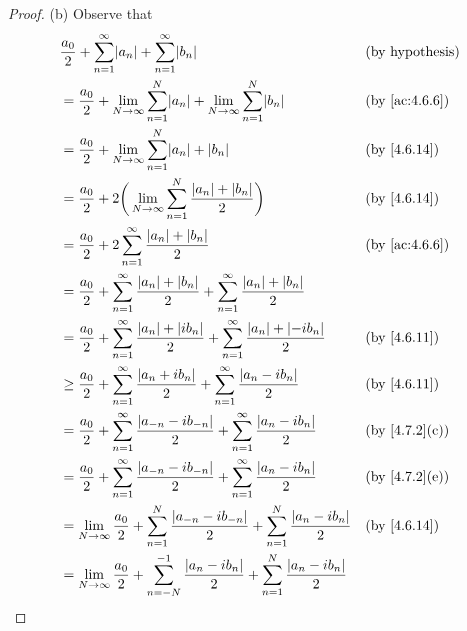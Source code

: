 \begin{proof}{(b)}
  Observe that
  \begin{align*}
     & \dfrac{a_0}{2} + \sum_{n = 1}^\infty \abs{a_n} + \sum_{n = 1}^\infty \abs{b_n}                                                               &  & \text{(by hypothesis)}      \\
     & = \dfrac{a_0}{2} + \lim_{N \to \infty} \sum_{n = 1}^N \abs{a_n} + \lim_{N \to \infty} \sum_{n = 1}^N \abs{b_n}                               &  & \text{(by \cref{ac:4.6.6})} \\
     & = \dfrac{a_0}{2} + \lim_{N \to \infty} \sum_{n = 1}^N \abs{a_n} + \abs{b_n}                                                                  &  & \text{(by \cref{4.6.14})}   \\
     & = \dfrac{a_0}{2} + 2 \bigg(\lim_{N \to \infty} \sum_{n = 1}^N \dfrac{\abs{a_n} + \abs{b_n}}{2}\bigg)                                         &  & \text{(by \cref{4.6.14})}   \\
     & = \dfrac{a_0}{2} + 2 \sum_{n = 1}^\infty \dfrac{\abs{a_n} + \abs{b_n}}{2}                                                                    &  & \text{(by \cref{ac:4.6.6})} \\
     & = \dfrac{a_0}{2} + \sum_{n = 1}^\infty \dfrac{\abs{a_n} + \abs{b_n}}{2} + \sum_{n = 1}^\infty \dfrac{\abs{a_n} + \abs{b_n}}{2}                                                \\
     & = \dfrac{a_0}{2} + \sum_{n = 1}^\infty \dfrac{\abs{a_n} + \abs{i b_n}}{2} + \sum_{n = 1}^\infty \dfrac{\abs{a_n} + \abs{-i b_n}}{2}          &  & \text{(by \cref{4.6.11})}   \\
     & \geq \dfrac{a_0}{2} + \sum_{n = 1}^\infty \dfrac{\abs{a_n + i b_n}}{2} + \sum_{n = 1}^\infty \dfrac{\abs{a_n - i b_n}}{2}                    &  & \text{(by \cref{4.6.11})}   \\
     & = \dfrac{a_0}{2} + \sum_{n = 1}^\infty \dfrac{\abs{a_{-n} - i b_{-n}}}{2} + \sum_{n = 1}^\infty \dfrac{\abs{a_n - i b_n}}{2}                 &  & \text{(by \cref{4.7.2}(c))} \\
     & = \dfrac{a_0}{2} + \sum_{n = 1}^\infty \dfrac{\abs{a_{-n} - i b_{-n}}}{2} + \sum_{n = 1}^\infty \dfrac{\abs{a_n - i b_n}}{2}                 &  & \text{(by \cref{4.7.2}(e))} \\
     & = \lim_{N \to \infty} \dfrac{a_0}{2} + \sum_{n = 1}^N \dfrac{\abs{a_{-n} - i b_{-n}}}{2} + \sum_{n = 1}^N \dfrac{\abs{a_n - i b_n}}{2}       &  & \text{(by \cref{4.6.14})}   \\
     & = \lim_{N \to \infty} \dfrac{a_0}{2} + \sum_{n = -N}^{-1} \dfrac{\abs{a_n - i b_n}}{2} + \sum_{n = 1}^N \dfrac{\abs{a_n - i b_n}}{2}                                          \\

\end{align*}
\end{proof}
